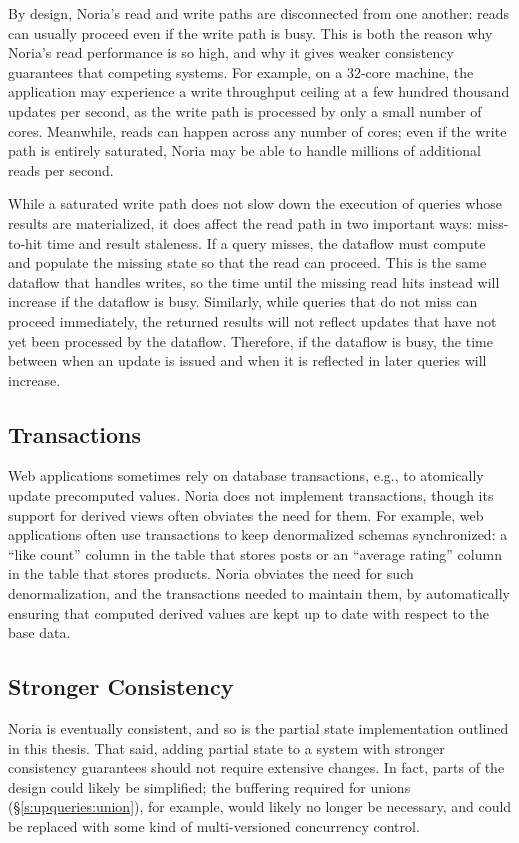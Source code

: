 By design, Noria's read and write paths are disconnected from one another: reads
can usually proceed even if the write path is busy. This is both the reason why
Noria's read performance is so high, and why it gives weaker consistency
guarantees that competing systems. For example, on a 32-core machine, the
application may experience a write throughput ceiling at a few hundred thousand
updates per second, as the write path is processed by only a small number of
cores. Meanwhile, reads can happen across any number of cores; even if the write
path is entirely saturated, Noria may be able to handle millions of additional
reads per second.

While a saturated write path does not slow down the execution of queries whose
results are materialized, it does affect the read path in two important ways:
miss-to-hit time and result staleness. If a query misses, the dataflow must
compute and populate the missing state so that the read can proceed. This is the
same dataflow that handles writes, so the time until the missing read hits
instead will increase if the dataflow is busy. Similarly, while queries that do
not miss can proceed immediately, the returned results will not reflect updates
that have not yet been processed by the dataflow. Therefore, if the dataflow is
busy, the time between when an update is issued and when it is reflected in
later queries will increase.

\subsection{Transactions}

Web applications sometimes rely on database transactions, e.g., to atomically
update precomputed values. Noria does not implement transactions, though its
support for derived views often obviates the need for them. For example, web
applications often use transactions to keep denormalized schemas synchronized: a
``like count'' column in the table that stores posts or an ``average rating''
column in the table that stores products. Noria obviates the need for such
denormalization, and the transactions needed to maintain them, by automatically
ensuring that computed derived values are kept up to date with respect to the
base data.

\subsection{Stronger Consistency}

Noria is eventually consistent, and so is the partial state implementation
outlined in this thesis. That said, adding partial state to a system with
stronger consistency guarantees should not require extensive changes. In fact,
parts of the design could likely be simplified; the buffering required for
unions (\S\ref{s:upqueries:union}), for example, would likely no longer be
necessary, and could be replaced with some kind of multi-versioned concurrency
control.
